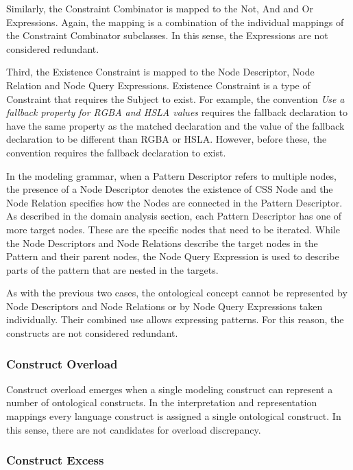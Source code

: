 Similarly, the Constraint Combinator is mapped to the Not, And and Or Expressions. Again, the
mapping is a combination of the individual mappings of the Constraint Combinator subclasses. In
this sense, the Expressions are not considered redundant.

Third, the Existence Constraint is mapped to the Node Descriptor, Node
Relation and Node Query Expressions. Existence Constraint is a type of
Constraint that requires the Subject to exist. For example, the convention
\textit{Use a fallback property for RGBA and HSLA values} requires the
fallback declaration to have the same property as the matched declaration and
the value of the fallback declaration to be different than RGBA or HSLA.
However, before these, the convention requires the fallback declaration to
exist.

In the modeling grammar, when a Pattern Descriptor refers to multiple nodes,
the presence of a Node Descriptor denotes the existence of CSS Node and the
Node Relation specifies how the Nodes are connected in the Pattern Descriptor.
As described in the domain analysis section, each Pattern Descriptor has one
of more target nodes. These are the specific nodes that need to be iterated. While
the Node Descriptors and Node Relations describe the target nodes in the
Pattern and their parent nodes, the Node Query Expression is used to describe
parts of the pattern that are nested in the targets.

As with the previous two cases, the ontological concept cannot be represented
by Node Descriptors and Node Relations or by Node Query Expressions taken
individually. Their combined use allows expressing patterns. For this reason,
the constructs are not considered redundant.


\subsubsection{Construct Overload}

Construct overload emerges when a single modeling construct can represent a
number of ontological constructs. In the interpretation and representation
mappings every language construct is assigned a single ontological construct.
In this sense, there are not candidates for overload discrepancy.

\subsubsection{Construct Excess}

